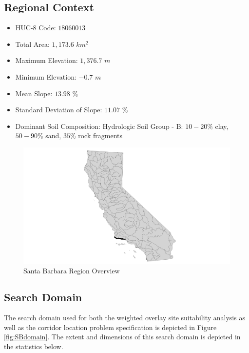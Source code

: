     \subsection{Regional Context}
    
    \begin{itemize}
      \setlength{\itemsep}{0cm}
      \setlength{\parskip}{0cm}
        \item HUC-8 Code: $18060013$
        \item Total Area: $1,173.6$ $km^2$
        \item Maximum Elevation: $1,376.7$ $m$
        \item Minimum Elevation: $-0.7$ $m$
        \item Mean Slope: $13.98$ $\%$
        \item Standard Deviation of Slope: $11.07$ $\%$
        \item Dominant Soil Composition: Hydrologic Soil Group - B: $10-20\%$ clay, $50-90\%$ sand, $35\%$ rock fragments
    \end{itemize}
    
        \begin{figure}[!h]
            \begin{center}
            \includegraphics[width=5.5in]{figures/SantaBarbara_Overview.png}   
            \caption{Santa Barbara Region Overview}
            \label{fig:SBoverview}
            \end{center}
        \end{figure}

    \subsection{Search Domain}

The search domain used for both the weighted overlay site suitability analysis as well as the corridor location problem specification is depicted in Figure \ref{fig:SBdomain}. The extent and dimensions of this search domain is depicted in the statistics below.
    
